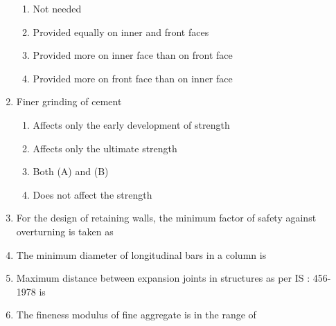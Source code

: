 \documentclass[11pt,a4paper]{article}
\begin{document}
\begin{enumerate}
\begin{enumerate}[label=\Alph*.]
\item{Not needed}
\item{Provided equally on inner and front faces}
\item{Provided more on inner face than on front face}
\item{Provided more on front face than on inner face}
\end{enumerate}
\item{Finer grinding of cement}
\begin{enumerate}[label=\Alph*.]
\item{Affects only the early development of strength}
\item{Affects only the ultimate strength}
\item{Both (A) and (B)}
\item{Does not affect the strength}
\end{enumerate}
\item{For the design of retaining walls, the minimum factor of safety against overturning is taken as}
\\
\item{The minimum diameter of longitudinal bars in a column is}
\\\begin{enumerate*}[itemjoin=\qquad, label=\Alph*.]
\item{6 mm}
\item{8 mm}
\item{12 mm}
\item{16 mm}
\end{enumerate*}
\item{Maximum distance between expansion joints in structures as per IS : 456-1978 is
}
\\
\item{The fineness modulus of fine aggregate is in the range of}

\end{enumerate}
\end{document}
